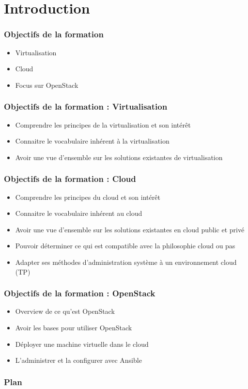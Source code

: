  \section*{Introduction}
  \begin{frame}
    \frametitle{Objectifs de la formation}
    \begin{itemize}
      \item Virtualisation
      \item Cloud
      \item Focus sur OpenStack
    \end{itemize}
  \end{frame}
  
  \begin{frame}
    \frametitle{Objectifs de la formation : Virtualisation}
    \begin{itemize}
      \item Comprendre les principes de la virtualisation et son intérêt
      \item Connaitre le vocabulaire inhérent à la virtualisation
      \item Avoir une vue d'ensemble sur les solutions existantes de virtualisation
    \end{itemize}
  \end{frame}
  
  \begin{frame}
    \frametitle{Objectifs de la formation : Cloud}
    \begin{itemize}
      \item Comprendre les principes du cloud et son intérêt
      \item Connaitre le vocabulaire inhérent au cloud
      \item Avoir une vue d'ensemble sur les solutions existantes en cloud public et privé
      \item Pouvoir déterminer ce qui est compatible avec la philosophie cloud ou pas
      \item Adapter ses méthodes d'administration système à un environnement cloud (TP)
    \end{itemize}
  \end{frame}

  \begin{frame}
    \frametitle{Objectifs de la formation : OpenStack}
    \begin{itemize}
      \item Overview de ce qu'est OpenStack
      \item Avoir les bases pour utiliser OpenStack
      \item Déployer une machine virtuelle dans le cloud
      \item L'administrer et la configurer avec Ansible
    \end{itemize}
  \end{frame}

  \begin{frame}
    \frametitle{Plan}
    \tableofcontents[hideallsubsections]
  \end{frame}
